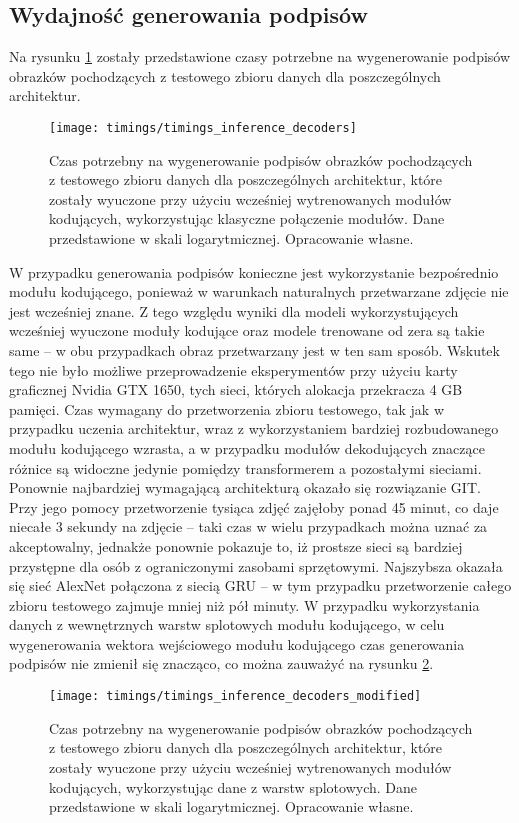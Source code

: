 \subsection{Wydajność generowania podpisów}
Na rysunku \ref{fig:timings-decoders-inference} zostały przedstawione czasy potrzebne na wygenerowanie podpisów obrazków pochodzących z testowego zbioru danych dla poszczególnych architektur.
\begin{figure}[H]
    \centering
    \texttt{[image: timings/timings\_inference\_decoders]}
    \caption{Czas potrzebny na wygenerowanie podpisów obrazków pochodzących z testowego zbioru danych dla poszczególnych architektur, które zostały wyuczone przy użyciu wcześniej wytrenowanych modułów kodujących, wykorzystując klasyczne połączenie modułów. Dane przedstawione w skali logarytmicznej. Opracowanie własne.}
    \label{fig:timings-decoders-inference}
\end{figure}
\noindent W przypadku generowania podpisów konieczne jest wykorzystanie bezpośrednio modułu kodującego, ponieważ w warunkach naturalnych przetwarzane zdjęcie nie jest wcześniej znane. Z tego względu wyniki dla modeli wykorzystujących wcześniej wyuczone moduły kodujące oraz modele trenowane od zera są takie same -- w obu przypadkach obraz przetwarzany jest w ten sam sposób. Wskutek tego nie było możliwe przeprowadzenie eksperymentów przy użyciu karty graficznej Nvidia GTX 1650, tych sieci, których alokacja przekracza 4 GB pamięci. Czas wymagany do przetworzenia zbioru testowego, tak jak w przypadku uczenia architektur, wraz z wykorzystaniem bardziej rozbudowanego modułu kodującego wzrasta, a w przypadku modułów dekodujących znaczące różnice są widoczne jedynie pomiędzy transformerem a pozostałymi sieciami. Ponownie najbardziej wymagającą architekturą okazało się rozwiązanie GIT. Przy jego pomocy przetworzenie tysiąca zdjęć zajęłoby ponad 45 minut, co daje niecałe 3 sekundy na zdjęcie -- taki czas w wielu przypadkach można uznać za akceptowalny, jednakże ponownie pokazuje to, iż prostsze sieci są bardziej przystępne dla osób z ograniczonymi zasobami sprzętowymi. Najszybsza okazała się sieć AlexNet połączona z siecią GRU -- w tym przypadku przetworzenie całego zbioru testowego zajmuje mniej niż pół minuty.
W przypadku wykorzystania danych z wewnętrznych warstw splotowych modułu kodującego, w celu wygenerowania wektora wejściowego modułu kodującego czas generowania podpisów nie zmienił się znacząco, co można zauważyć na rysunku \ref{fig:timings-decoders-inference-modified}.
\begin{figure}[H]
    \centering
    \texttt{[image: timings/timings\_inference\_decoders\_modified]}
    \caption{Czas potrzebny na wygenerowanie podpisów obrazków pochodzących z testowego zbioru danych dla poszczególnych architektur, które zostały wyuczone przy użyciu wcześniej wytrenowanych modułów kodujących, wykorzystując dane z warstw splotowych. Dane przedstawione w skali logarytmicznej. Opracowanie własne.}
    \label{fig:timings-decoders-inference-modified}
\end{figure}
